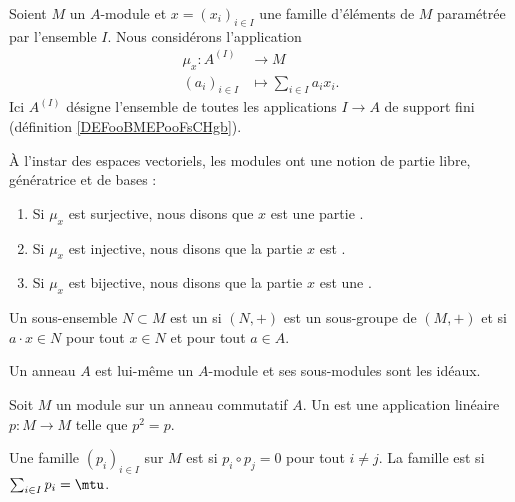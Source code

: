 Soient \( M\) un \( A\)-module et \( x=(x_i)_{i\in I}\) une famille d'éléments de \( M\) paramétrée par l'ensemble \( I\). Nous considérons l'application
\begin{equation}
	\begin{aligned}
		\mu_x\colon A^{(I)} & \to M                        \\
		(a_i)_{i\in I}      & \mapsto \sum_{i\in I}a_ix_i.
	\end{aligned}
\end{equation}
Ici \( A^{(I)}\) désigne l'ensemble de toutes les applications \( I\to A\) de support fini (définition \ref{DEFooBMEPooFsCHgb}).

\begin{definition}      \label{DefBasePouyKj}
	À l'instar des espaces vectoriels, les modules ont une notion de partie libre, génératrice et de bases :
	\begin{enumerate}
		\item
		      Si \( \mu_x\) est surjective, nous disons que \( x\) est une partie .
		\item
		      Si \( \mu_x\) est injective, nous disons que la partie \( x\) est .
		\item
		      Si \( \mu_x\) est bijective, nous disons que la partie \( x\) est une .
	\end{enumerate}
\end{definition}

\begin{definition}
	Un sous-ensemble \( N\subset M\) est un  si \( (N,+)\) est un sous-groupe de \( (M,+)\) et si \( a\cdot x\in N\) pour tout \( x\in N\) et pour tout \( a\in A\).
\end{definition}

\begin{example}
	Un anneau \( A\) est lui-même un \( A\)-module et ses sous-modules sont les idéaux.
\end{example}

\begin{definition}[Projecteur]		\label{DEFooZACWooWydFDp}
	Soit \( M\) un module sur un anneau commutatif \( A\). Un  est une application linéaire \( p\colon M\to M\) telle que \( p^2=p\).

	Une famille \( (p_i)_{i\in I}\) sur \( M\) est  si \( p_i\circ p_j=0\) pour tout \( i\neq j\). La famille est  si \( \sum_{i\in I}p_i=\mtu\).
\end{definition}


